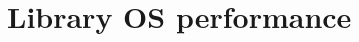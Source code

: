 \section{Library OS performance}
\label{sec:eval:libos}

\makeatletter
{}
\makeatother
\graphicspath{{eval/emu/figures/}}








\makeatletter
{}
\makeatother
\graphicspath{{eval/figures/}}
